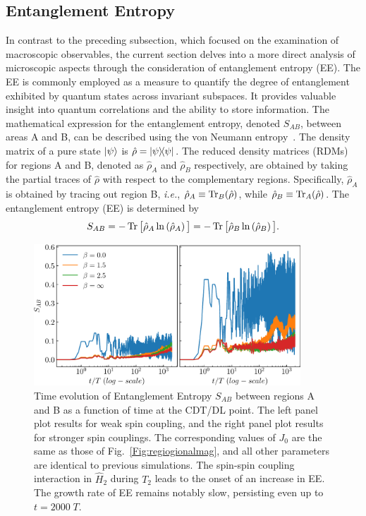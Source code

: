 \documentclass[12pt]{iopart}
\begin{document}
	
	\subsection{\label{sec:level41} Entanglement Entropy}
In contrast to the preceding subsection, which focused on the examination of macroscopic observables, the current section delves into a more direct analysis of microscopic aspects through the consideration of entanglement entropy (EE). The EE is commonly employed as a measure to quantify the degree of entanglement exhibited by quantum states across invariant subspaces. It provides valuable insight into quantum correlations and the ability to store information. The mathematical expression for the entanglement entropy, denoted $S_{AB}$, between areas A and B, can be described using the von Neumann entropy~\cite{bayat_entanglement_2022,mendes-santos_measuring_2020}.   The density matrix of a pure state $\ket{\psi}$ is $\hat{\rho}= \ketbra{\psi}$. The reduced density matrices (RDMs) for regions A and B, denoted as $\hat{\rho}_A$ and $\hat{\rho}_B$ respectively, are obtained by taking the partial traces of $\hat{\rho}$ with respect to the complementary regions. Specifically, $\hat{\rho}_A$ is obtained by tracing out region B, \textit{i.e.}, $\hat{\rho}_A\equiv \mathop{\mathrm{Tr}}\nolimits_B(\hat{\rho})$, while $\hat{\rho}_B\equiv\mathop{\mathrm{Tr}}\nolimits_A(\hat{\rho})$. The entanglement entropy (EE) is determined by
\begin{equation} 
    S_{AB} = -\mathop{\mathrm{Tr}}\nolimits\big[\hat{\rho}_A \ln\left(\hat{\rho}_A\right)\big] = -\mathop{\mathrm{Tr}}\nolimits\big[\hat{\rho}_B \ln\left(\hat{\rho}_B\right)\big].
    \label{eq:vonentrop}
\end{equation}	
\begin{figure}[t!]
    \begin{center}
        \includegraphics[width=10cm]{entangEntrp.pdf}
    \end{center}
    \caption{Time evolution of Entanglement Entropy $S_{AB}$ between regions A and B as a function of time at the CDT/DL point. The left panel plot results for weak spin coupling, and the right panel plot results for stronger spin couplings. The corresponding values of $J_0$ are the same as those of Fig.~\ref{Fig:regiogionalmag}, and all other parameters are identical to previous simulations. The spin-spin coupling interaction in $\hat{H}_2$ during $T_2$ leads to the onset of an increase in EE. The growth rate of EE remains notably slow, persisting even up to $t=2000\;T$.}
    \label{Fig:entangle}
\end{figure}
\end{document}
